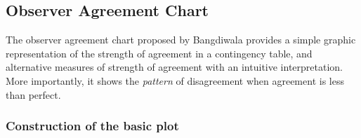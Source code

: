 \documentclass[10pt,krantz2]{krantz}\usepackage[]{graphicx}\usepackage[]{color}
\begin{document}
\subsection[Observer Agreement Chart]{Observer Agreement Chart}
\label{sec:twoway-Bangdiwala}
The observer agreement chart proposed by Bangdiwala
\citeyearpar{Bangdiwala:1985,Bangdiwala:87} provides a simple
graphic representation of the strength of agreement in a contingency
table, and alternative measures of strength of agreement with an intuitive
interpretation. More importantly, it shows the \emph{pattern} of disagreement
when agreement is less than perfect.

\subsubsection{Construction of the basic plot}
\end{document}
